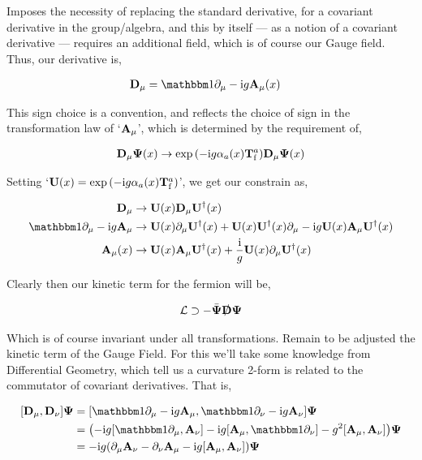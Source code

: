 Imposes the necessity of replacing the standard derivative, for a covariant derivative in the group/algebra, and this by itself --- as a notion of a covariant derivative --- requires an additional field, which is of course our Gauge field. Thus, our derivative is,

\begin{align}
    \vb D_\mu&=\mathbbm 1\partial_\mu-\im g \vb A_\mu\qty(x)\nonumber
\end{align}

This sign choice is a convention, and reflects the choice of sign in the transformation law of `$\vb A_\mu$', which is determined by the requirement of,

\begin{align}
    \vb D_\mu\boldsymbol\Psi\qty(x)\rightarrow\exp\qty(-\textnormal{i} g\alpha_a\qty(x)\vb T^a_{\textnormal f})\vb D_\mu\boldsymbol\Psi\qty(x)\nonumber
\end{align}

Setting `$\vb U\qty(x)=\exp\qty(-\textnormal{i} g\alpha_a\qty(x)\vb T^a_{\textnormal f})$', we get our constrain as,

\begin{align}
    \vb D_\mu&\rightarrow\vb U\qty(x)\vb D_\mu\vb U^\dagger\qty(x)\nonumber\\
    \mathbbm 1\partial_\mu-\im g\vb A_\mu&\rightarrow\vb U\qty(x)\partial_\mu\vb U^\dagger\qty(x)+\vb U\qty(x)\vb U^\dagger\qty(x)\partial_\mu-\im g \vb U\qty(x)\vb A_\mu\vb U^\dagger\qty(x)\nonumber\\
    \vb A_\mu\qty(x)&\rightarrow\vb U\qty(x)\vb A_\mu\vb U^\dagger\qty(x)+\frac{\im}{g}\vb U\qty(x)\partial_\mu\vb U^\dagger\qty(x)\nonumber
\end{align}

Clearly then our kinetic term for the fermion will be,

\begin{align}
    \mathcal L\supset -\bar{\boldsymbol\Psi}\slashed{\vb D}\boldsymbol\Psi\nonumber
\end{align}

Which is of course invariant under all transformations. Remain to be adjusted the kinetic term of the Gauge Field. For this we'll take some knowledge from Differential Geometry, which tell us a curvature 2-form is related to the commutator of covariant derivatives. That is,

\begin{align}
    \comm{\vb D_\mu}{\vb D_\nu}\boldsymbol\Psi&=\comm{\mathbbm 1\partial_\mu-\im g\vb A_\mu}{\mathbbm 1\partial_\nu-\im g\vb A_\nu}\boldsymbol\Psi\nonumber\\
    &=\qty(-\im g\comm{\mathbbm 1\partial_\mu}{\vb A_\nu}-\im g\comm{\vb A_\mu}{\mathbbm 1\partial_\nu}-g^2\comm{\vb A_\mu}{\vb A_\nu})\boldsymbol\Psi\nonumber\\
    &=-\im g\qty(\partial_\mu\vb A_\nu-\partial_\nu\vb A_\mu-\im g\comm{\vb A_\mu}{\vb A_\nu})\boldsymbol\Psi\nonumber
\end{align}

